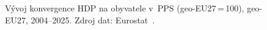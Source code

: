 \def\strStavHdpVyvojTitle{Konvergence \acs{HDP} na obyvatele}%
\def\strStavHdpVyvojYlabel{\acs{HDP}/cap. (\acs{PPS}, \acs{geo-EU27} = 100) [\si{\percent}]}%
\providecommand\NudgeStavHdpVyvojCz{0pt}%
\providecommand\NudgeStavHdpVyvojSk{0pt}%
\providecommand\NudgeStavHdpVyvojPl{0pt}%
\providecommand\NudgeStavHdpVyvojAt{3pt}%
\providecommand\NudgeStavHdpVyvojDe{-3pt}%
\providecommand\NudgeStavHdpVyvojDk{0pt}%
\providecommand\NudgeStavHdpVyvojEuref{0pt}%
\def\strStavHdpVyvojCaption{Vývoj konvergence \acs{HDP} na obyvatele v~\acs{PPS} (\acs{geo-EU27}\,=\,100), \acs{geo-EU27}, 2004--2025. Zdroj dat: Eurostat~\cite{eurostat_nama_10_pc_PPS_EU27eq100}.}%
%
\begin{figure}[H]
  \centering
  
  \caption{\strStavHdpVyvojCaption}
  \label{fig:stav_hdp_vyvoj}
\end{figure}
